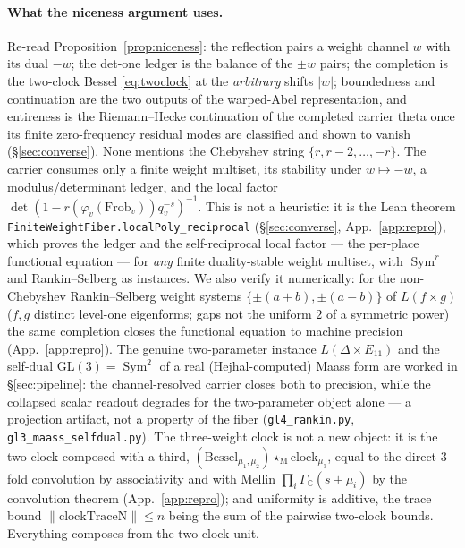 \documentclass[11pt]{article}
\theoremstyle{definition}
\newcommand{\Sym}{\operatorname{Sym}}
\begin{document}
\paragraph{What the niceness argument uses.} Re-read Proposition~\ref{prop:niceness}: the reflection
pairs a weight channel $w$ with its dual $-w$; the det-one ledger is the balance of the $\pm w$ pairs;
the completion is the two-clock Bessel \eqref{eq:twoclock} at the \emph{arbitrary} shifts $|w|$;
boundedness and continuation are the two outputs of the warped-Abel representation, and entireness is the
Riemann--Hecke continuation of the completed carrier theta once its finite zero-frequency residual modes
are classified and shown to vanish (\S\ref{sec:converse}). None mentions the
Chebyshev string $\{r,r-2,\dots,-r\}$. The carrier consumes only a finite weight multiset, its stability
under $w\mapsto-w$, a modulus/determinant ledger, and the local factor
$\det(1-r(\varphi_v(\mathrm{Frob}_v))q_v^{-s})^{-1}$. This is not a heuristic: it is the Lean theorem
\texttt{FiniteWeightFiber.localPoly\_reciprocal} (\S\ref{sec:converse}, App.~\ref{app:repro}), which proves
the ledger and the self-reciprocal local factor --- the per-place functional equation --- for \emph{any}
finite duality-stable weight multiset, with $\Sym^r$ and Rankin--Selberg as instances. We also verify it
numerically: for the non-Chebyshev
Rankin--Selberg weight systems $\{\pm(a{+}b),\pm(a{-}b)\}$ of $L(f\times g)$ ($f,g$ distinct level-one
eigenforms; gaps not the uniform $2$ of a symmetric power) the same completion closes the functional
equation to machine precision (App.~\ref{app:repro}). The genuine two-parameter instance $L(\Delta\times E_{11})$
and the self-dual $\mathrm{GL}(3)=\Sym^2$ of a real (Hejhal-computed) Maass form are worked in
\S\ref{sec:pipeline}: the channel-resolved carrier closes both to precision, while the collapsed scalar readout
degrades for the two-parameter object alone --- a projection artifact, not a property of the fiber
(\texttt{gl4\_rankin.py}, \texttt{gl3\_maass\_selfdual.py}). The three-weight clock is not a new object: it is
the two-clock composed with a third, $(\text{Bessel}_{\mu_1,\mu_2})\star_{\mathrm M}\text{clock}_{\mu_3}$,
equal to the direct $3$-fold convolution by associativity and with Mellin $\prod_i\Gamma_{\mathbb C}(s+
\mu_i)$ by the convolution theorem (App.~\ref{app:repro}); and uniformity is additive, the trace bound
$\|\mathrm{clockTraceN}\|\le n$ being the sum of the pairwise two-clock bounds. Everything composes from
the two-clock unit.
\end{document}
